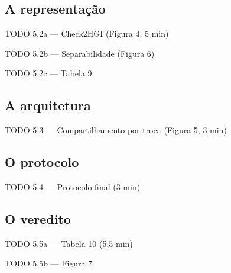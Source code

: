 \documentclass{beamer}
\begin{document}
\subsection{A representação}
\begin{frame}{TODO 5.2a --- Check2HGI (Figura 4, 5 min)}
\end{frame}
\begin{frame}{TODO 5.2b --- Separabilidade (Figura 6)}
\end{frame}
\begin{frame}{TODO 5.2c --- Tabela 9}
\end{frame}

\subsection{A arquitetura}
\begin{frame}{TODO 5.3 --- Compartilhamento por troca (Figura 5, 3 min)}
\end{frame}

\subsection{O protocolo}
\begin{frame}{TODO 5.4 --- Protocolo final (3 min)}
\end{frame}

\subsection{O veredito}
\begin{frame}{TODO 5.5a --- Tabela 10 (5,5 min)}
\end{frame}
\begin{frame}{TODO 5.5b --- Figura 7}
\end{frame}
\end{document}
